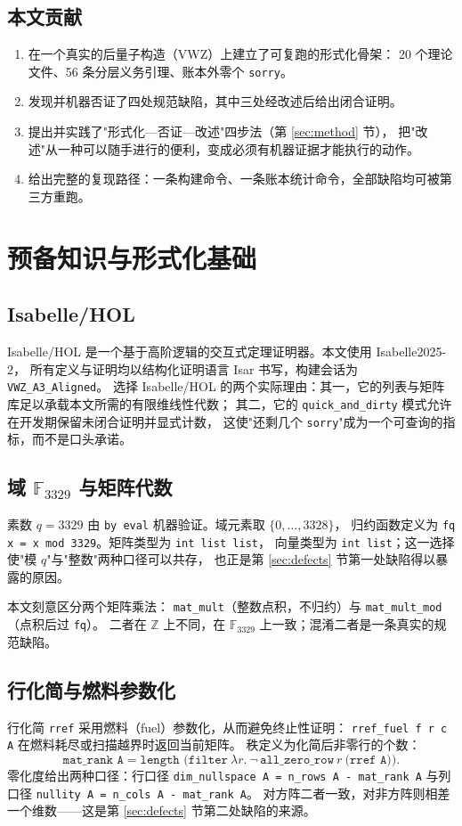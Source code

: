 \documentclass[UTF8,fontset=windows,zihao=-4,a4paper]{ctexart}
\newcommand{\code}[1]{\texttt{#1}}
\newcommand{\Fq}{\mathbb{F}_{3329}}
\begin{document}
\subsection{本文贡献}
\begin{enumerate}
  \item 在一个真实的后量子构造（VWZ）上建立了可复跑的形式化骨架：
        20 个理论文件、56 条分层义务引理、账本外零个 \code{sorry}。
  \item 发现并机器否证了四处规范缺陷，其中三处经改述后给出闭合证明。
  \item 提出并实践了"形式化—否证—改述"四步法（第 \ref{sec:method} 节），
        把"改述"从一种可以随手进行的便利，变成必须有机器证据才能执行的动作。
  \item 给出完整的复现路径：一条构建命令、一条账本统计命令，全部缺陷均可被第三方重跑。
\end{enumerate}

\section{预备知识与形式化基础}

\subsection{Isabelle/HOL}
Isabelle/HOL 是一个基于高阶逻辑的交互式定理证明器\cite{isabelle,paulson}。本文使用 Isabelle2025-2，
所有定义与证明均以结构化证明语言 Isar 书写，构建会话为 \code{VWZ\_A3\_Aligned}。
选择 Isabelle/HOL 的两个实际理由：其一，它的列表与矩阵库足以承载本文所需的有限维线性代数；
其二，它的 \code{quick\_and\_dirty} 模式允许在开发期保留未闭合证明并显式计数，
这使"还剩几个 \code{sorry}"成为一个可查询的指标，而不是口头承诺。

\subsection{域 $\Fq$ 与矩阵代数}
素数 $q = 3329$ 由 \code{by eval} 机器验证。域元素取 $\{0,\dots,3328\}$，
归约函数定义为 \code{fq x = x mod 3329}。矩阵类型为 \code{int list list}，
向量类型为 \code{int list}；这一选择使"模 $q$"与"整数"两种口径可以共存，
也正是第 \ref{sec:defects} 节第一处缺陷得以暴露的原因。

本文刻意区分两个矩阵乘法：
\code{mat\_mult}（整数点积，不归约）与 \code{mat\_mult\_mod}（点积后过 \code{fq}）。
二者在 $\mathbb{Z}$ 上不同，在 $\Fq$ 上一致；混淆二者是一条真实的规范缺陷。

\subsection{行化简与燃料参数化}
行化简 \code{rref} 采用燃料（fuel）参数化，从而避免终止性证明：
\code{rref\_fuel f r c A} 在燃料耗尽或扫描越界时返回当前矩阵。
秩定义为化简后非零行的个数：
\[
  \code{mat\_rank A} = \code{length (filter}\ \lambda r.\ \neg\,\code{all\_zero\_row}\ r\ \code{(rref A))}.
\]
零化度给出两种口径：行口径 \code{dim\_nullspace A = n\_rows A - mat\_rank A}
与列口径 \code{nullity A = n\_cols A - mat\_rank A}。
对方阵二者一致，对非方阵则相差一个维数——这是第 \ref{sec:defects} 节第二处缺陷的来源。
\end{document}
